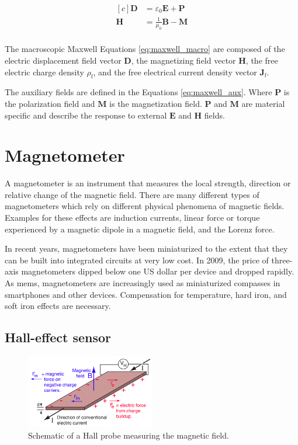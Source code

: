 \begin{equation}
\label{eq:maxwell_aux}
    \begin{aligned}[c]
        \bm{D} &= \varepsilon_0 \bm{E} + \bm{P}\\
        \bm{H} &= \frac{1}{\mu_0} \bm{B} - \bm{M}\\
    \end{aligned}
\end{equation}

The macroscopic Maxwell Equations \ref{eq:maxwell_macro} are composed of the electric displacement field vector $\bm{D}$, the magnetizing field vector $\bm{H}$, the free electric charge density $\rho_\text{f}$, and the free electrical current density vector $\bm{J}_\text{f}$.

The auxiliary fields are defined in the Equations \ref{eq:maxwell_aux}. Where $\bm{P}$ is the polarization field and $\bm{M}$ is the magnetization field. $\bm{P}$ and $\bm{M}$ are material specific and describe the response to external $\bm{E}$ and $\bm{H}$ fields.

\section{Magnetometer}

A magnetometer is an instrument that measures the local strength, direction or relative change of the magnetic field. There are many different types of magnetometers which rely on different physical phenomena of magnetic fields. Examples for these effects are induction currents, linear force or torque experienced by a magnetic dipole in a magnetic field, and the Lorenz force. 

In recent years, magnetometers have been miniaturized to the extent that they can be built into integrated circuits at very low cost. In 2009, the price of three-axis magnetometers dipped below one US dollar per device and dropped rapidly.\cite{magnetometer_price} As \gls{mems}, magnetometers are increasingly used as miniaturized compasses in smartphones and other devices. Compensation for temperature, hard iron, and soft iron effects are necessary.

\subsection{Hall-effect sensor}

\begin{figure}[hbt!]
    \centering
    \includegraphics[width=0.5\textwidth]{figures/hall_effect.png}
    \caption{Schematic of a Hall probe measuring the magnetic field.}
    \label{fig:hall_effect}
\end{figure}

